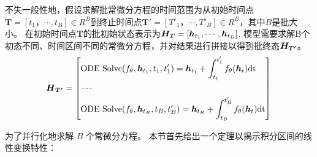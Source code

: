 不失一般性地，假设求解批常微分方程的时间范围为从初始时间点$\boldsymbol{T} = [t_1， \cdots,t_B]\in R^B$到终止时间点$\boldsymbol{T'} = [T' _1， \cdots, T' _B]\in R^B$，其中$B$是批大小。
在初始时间点$\boldsymbol{T}$的批初始状态表示为${\boldsymbol{H}}_{\boldsymbol{T}}=[\boldsymbol{h}_{t_1},\cdots,\boldsymbol{h}_{t_B}]$.
模型需要求解B个初态不同、时间区间不同的常微分方程，并对结果进行拼接以得到批终态${\boldsymbol{H}}_{\boldsymbol{T'}}$。
\begin{equation}
    \boldsymbol{{H}}_{\boldsymbol{T'}} = 
    \left[
    \begin{aligned}
  &\text{ODE Solve}(f_\theta, \boldsymbol{h}_{t_1}, t_1, t'_1) = \boldsymbol{h}_{t_1} + \int_{t_{1}}^{t'_1}f_{\theta}(\boldsymbol h_t) \text{dt}\\
  &\cdots\\
  &\text{ODE Solve}(f_\theta,\boldsymbol{h}_{t_B}, t_B, t'_B) = \boldsymbol{h}_{t_B} + \int_{t_{B}}^{t'_{B}}f_{\theta}(\boldsymbol h_t) \text{dt}
  \end{aligned}
    \right]\\
    \label{equ:solve_all_ode}
\end{equation}

为了并行化地求解 $B$ 个常微分方程。
本节首先给出一个定理以揭示积分区间的线性变换特性：

